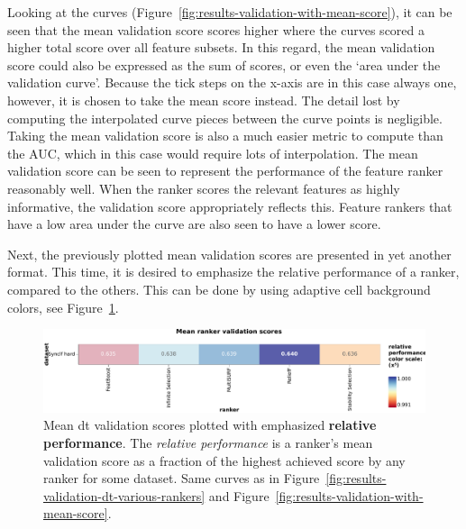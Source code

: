 \documentclass[../main.tex]{subfiles}
\begin{document}
Looking at the curves (Figure~\ref{fig:results-validation-with-mean-score}), it can be seen that the mean validation score scores higher where the curves scored a higher total score over all feature subsets. In this regard, the mean validation score could also be expressed as the sum of scores, or even the `area under the validation curve'. Because the tick steps on the x-axis are in this case always one, however, it is chosen to take the mean score instead. The detail lost by computing the interpolated curve pieces between the curve points is negligible. Taking the mean validation score is also a much easier metric to compute than the AUC, which in this case would require lots of interpolation. The mean validation score can be seen to represent the performance of the feature ranker reasonably well. When the ranker scores the relevant features as highly informative, the validation score appropriately reflects this. Feature rankers that have a low area under the curve are also seen to have a lower score.


Next, the previously plotted mean validation scores are presented in yet another format. This time, it is desired to emphasize the relative performance of a ranker, compared to the others. This can be done by using adaptive cell background colors, see Figure~\ref{fig:results-validation-with-mean-score-tabular}.

\begin{figure}[ht]
    \centering
    \includegraphics[width=\linewidth]{report/images/results-validation-with-mean-score-tabular.pdf}
    \caption{Mean \gls{dt} validation scores plotted with emphasized \textbf{relative performance}. The \textit{relative performance} is a ranker's mean validation score as a fraction of the highest achieved score by any ranker for some dataset. Same curves as in Figure~\ref{fig:results-validation-dt-various-rankers} and Figure~\ref{fig:results-validation-with-mean-score}.}
    \label{fig:results-validation-with-mean-score-tabular}
\end{figure}
\end{document}
